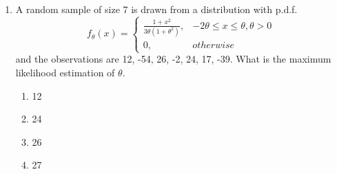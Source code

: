 \documentclass[journal,12pt,twocolumn]{IEEEtran}
\begin{document}
\begin{enumerate}[label=\arabic*.,ref=\theenumi]
\item A random sample of size 7 is drawn from a distribution with p.d.f. \\ 
\[
    f_\theta(x)= 
\begin{cases}
\frac{1 + x^2}{3\theta(1+\theta^2)},& -2\theta \leq x \leq \theta, \theta > 0\\
    0,              & otherwise
\end{cases}
\]
and the observations are 12, -54, 26, -2, 24, 17, -39. What is the maximum likelihood estimation of \(\theta\).
\begin{enumerate}
\item 12
\item 24
\item 26
\item 27
\end{enumerate}


\end{enumerate}
\end{document}
